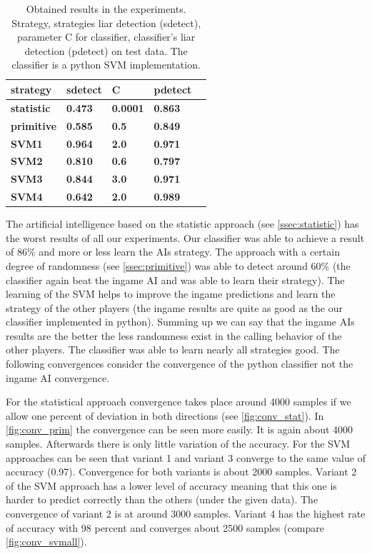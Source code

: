 \documentclass[11pt]{article}
\begin{document}
\begin{table}[H]
\centering
\small
\begin{tabular}{|l|l|l|l|l|}
\hline
\textbf{strategy}&\textbf{sdetect}&\textbf{C}&\textbf{pdetect} \\ \hline
\textbf{statistic}&\textbf{0.473}&\textbf{0.0001}&\textbf{0.863} \\ \hline
\textbf{primitive}&\textbf{0.585}&\textbf{0.5}&\textbf{0.849} \\ \hline
\textbf{SVM1}&\textbf{0.964}&\textbf{2.0}&\textbf{0.971} \\ \hline
\textbf{SVM2}&\textbf{0.810}&\textbf{0.6}&\textbf{0.797}\\ \hline 
\textbf{SVM3}&\textbf{0.844}&\textbf{3.0}&\textbf{0.971}\\ \hline 
\textbf{SVM4}&\textbf{0.642}&\textbf{2.0}&\textbf{0.989} \\ \hline
\end{tabular}
\caption{Obtained results in the experiments. Strategy, strategies liar detection (sdetect), parameter C for classifier, classifier's liar detection (pdetect) on test data. The classifier is a python SVM implementation.}
\label{tab:results}
\end{table}

The artificial intelligence based on the statistic approach (see \cref{ssec:statistic}) has the worst results of all our experiments. Our classifier was able to achieve a result of 86\% and more or less learn the AIs strategy.
The approach with a certain degree of randomness (see \cref{ssec:primitive}) was able to detect around 60\% (the classifier again beat the ingame AI and was able to learn their strategy).
The learning of the SVM helps to improve the ingame predictions and learn the strategy of the other players (the ingame results are quite as good as the our classifier implemented in python).
Summing up we can say that the ingame AIs results are the better the less randomness exist in the calling behavior of the other players.
The classifier was able to learn nearly all strategies good.
The following convergences consider the convergence of the python classifier not the ingame AI convergence.

For the statistical approach convergence takes place around 4000 samples if we allow one percent of deviation in both directions (see \cref{fig:conv_stat}). 
In \cref{fig:conv_prim} the convergence can be seen more easily. It is again about 4000 samples. Afterwards there is only little variation of the accuracy. 
For the SVM approaches can be seen that variant 1 and variant 3 converge to the same value of accuracy (0.97). Convergence for both variants is about 2000 samples. Variant 2 of the SVM approach has a lower level of accuracy meaning that this one is harder to predict correctly than the others (under the given data). The convergence of variant 2 is at around 3000 samples. Variant 4 has the highest rate of accuracy with 98 percent and converges about 2500 samples (compare \cref{fig:conv_svmall}).
\end{document}
